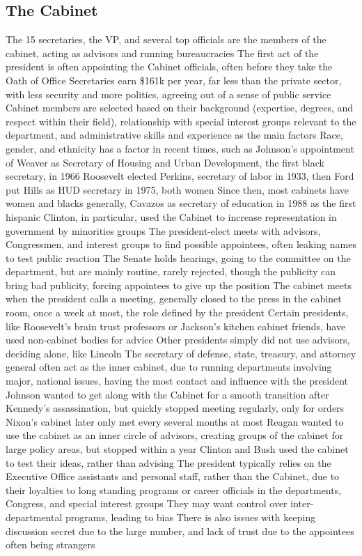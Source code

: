 \documentclass[11 pt, twoside]{article}
\newenvironment{outline*}
{
	\begin{outline}[enumerate]
	}
	{\end{outline}
}
\begin{document}
\subsection{The Cabinet}
\begin{outline*}
\1 The 15 secretaries, the VP, and several top officials are the members of the cabinet, acting as advisors and running bureaucracies
\2 The first act of the president is often appointing the Cabinet officials, often before they take the Oath of Office
\2 Secretaries earn \$161k per year, far less than the private sector, with less security and more politics, agreeing out of a sense of public service
\1 Cabinet members are selected based on their background (expertise, degrees, and respect within their field), relationship with special interest groups relevant to the department, and administrative skills and experience as the main factors
\2 Race, gender, and ethnicity has a factor in recent times, such as Johnson’s appointment of Weaver as Secretary of Housing and Urban Development, the first black secretary, in 1966
\2 Roosevelt elected Perkins, secretary of labor in 1933, then Ford put Hills as HUD secretary in 1975, both women
\2 Since then, most cabinets have women and blacks generally, Cavazos as secretary of education in 1988 as the first hispanic
\2 Clinton, in particular, used the Cabinet to increase representation in government by minorities groups
\1 The president-elect meets with advisors, Congressmen, and interest groups to find possible appointees, often leaking names to test public reaction
\2 The Senate holds hearings, going to the committee on the department, but are mainly routine, rarely rejected, though the publicity can bring bad publicity, forcing appointees to give up the position
\1 The cabinet meets when the president calls a meeting, generally closed to the press in the cabinet room, once a week at most, the role defined by the president
\2 Certain presidents, like Roosevelt’s brain trust professors or Jackson’s kitchen cabinet friends, have used non-cabinet bodies for advice
\2 Other presidents simply did not use advisors, deciding alone, like Lincoln
\2 The secretary of defense, state, treasury, and attorney general often act as the inner cabinet, due to running departments involving major, national issues, having the most contact and influence with the president
\1 Johnson wanted to get along with the Cabinet for a smooth transition after Kennedy’s assassination, but quickly stopped meeting regularly, only for orders
\2 Nixon’s cabinet later only met every several months at most
\2 Reagan wanted to use the cabinet as an inner circle of advisors, creating groups of the cabinet for large policy areas, but stopped within a year
\2 Clinton and Bush used the cabinet to test their ideas, rather than advising
\1 The president typically relies on the Executive Office assistants and personal staff, rather than the Cabinet, due to their loyalties to long standing programs or career officials in the departments, Congress, and special interest groups
\2 They may want control over inter-departmental programs, leading to bias
\2 There is also issues with keeping discussion secret due to the large number, and lack of trust due to the appointees often being strangers
\end{outline*}
\end{document}
